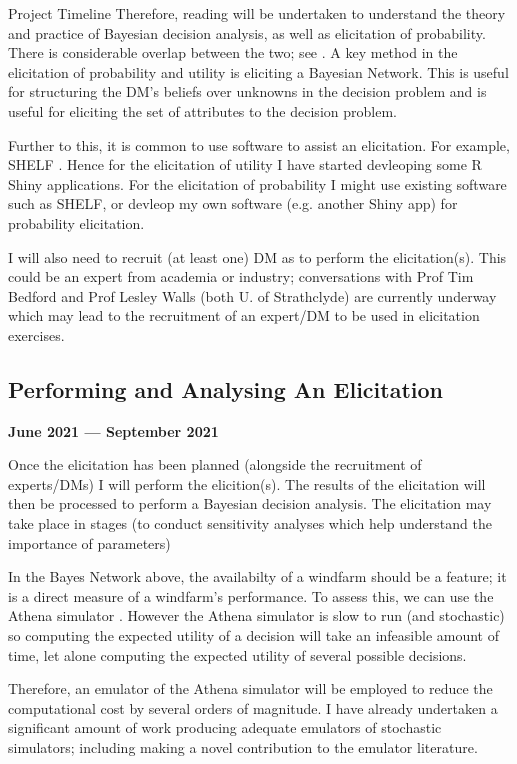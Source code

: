 \begin{chapter}{Project Timeline}
Therefore, reading will be undertaken to understand the theory and practice of Bayesian decision analysis, as well as elicitation of probability. There is considerable overlap between the two; see \citep{Smith2010}. A key method in the elicitation of probability and utility is eliciting a Bayesian Network. This is useful for structuring the DM's beliefs over unknowns in the decision problem and is useful for eliciting the set of attributes to the decision problem.


Further to this, it is common to use software to assist an elicitation. For example, SHELF \citep{SHELF4}. Hence for the elicitation of utility I have started devleoping some R Shiny applications. For the elicitation of probability I might use existing software such as SHELF, or devleop my own software (e.g. another Shiny app) for probability elicitation. 

I will also need to recruit (at least one) DM as to perform the elicitation(s). This could be an expert from academia or industry; conversations with Prof Tim Bedford and Prof Lesley Walls (both U. of Strathclyde) are currently underway which may lead to the recruitment of an expert/DM to be used in elicitation exercises.

\subsection{Performing and Analysing An Elicitation}

\textbf{June 2021 --- September 2021} 

Once the elicitation has been planned (alongside the recruitment of experts/DMs) I will perform the elicition(s). The results of the elicitation will then be processed to perform a Bayesian decision analysis. The elicitation may take place in stages (to conduct sensitivity analyses which help understand the importance of parameters)

In the Bayes Network above, the availabilty of a windfarm should be a feature; it is a direct measure of a windfarm's performance. To assess this, we can use the Athena simulator \citep{Zit13, Zit16}. However the Athena simulator is slow to run (and stochastic) so computing the expected utility of a decision will take an infeasible amount of time, let alone computing the expected utility of several possible decisions.

Therefore, an emulator of the Athena simulator will be employed to reduce the computational cost by several orders of magnitude. I have already undertaken a significant amount of work producing adequate emulators of stochastic simulators; including making a novel contribution to the emulator literature.


\end{chapter}
